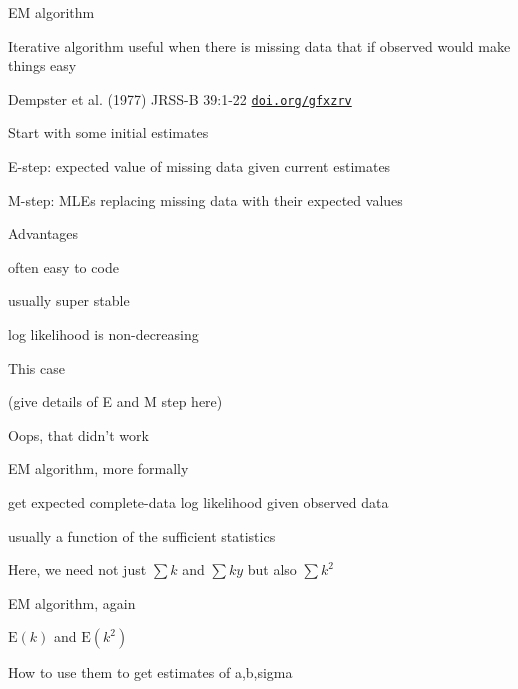 \documentclass[aspectratio=169,12pt,t]{beamer}
\begin{document}
\begin{frame}{EM algorithm}

\vspace{-3mm}

  \bbi
  \item Iterative algorithm useful when there is missing data that if
    observed would make things easy
  \item Dempster et al. (1977) JRSS-B 39:1-22
    \href{https://doi.org/gfxzrv}{\tt doi.org/gfxzrv}
  \item Start with some initial estimates
  \item {\hilit E-step}: expected value of missing data given current estimates
  \item {\hilit M-step}: MLEs replacing missing data with their expected values
  \item {\hilit Advantages}
    \bi
  \item often easy to code
  \item usually super stable
  \item log likelihood is non-decreasing
    \ei
    \ei

\end{frame}



\begin{frame}{This case}

  (give details of E and M step here)

\end{frame}




\begin{frame}{Oops, that didn't work}
\end{frame}




\begin{frame}{EM algorithm, more formally}

  get expected complete-data log likelihood given observed data

  usually a function of the sufficient statistics

  Here, we need not just $\sum k$ and $\sum k y$ but also $\sum k^2$

\end{frame}



\begin{frame}{EM algorithm, again}

  $\text{E}(k)$ and $\text{E}(k^2)$

  How to use them to get estimates of a,b,sigma

\end{frame}
\end{document}
